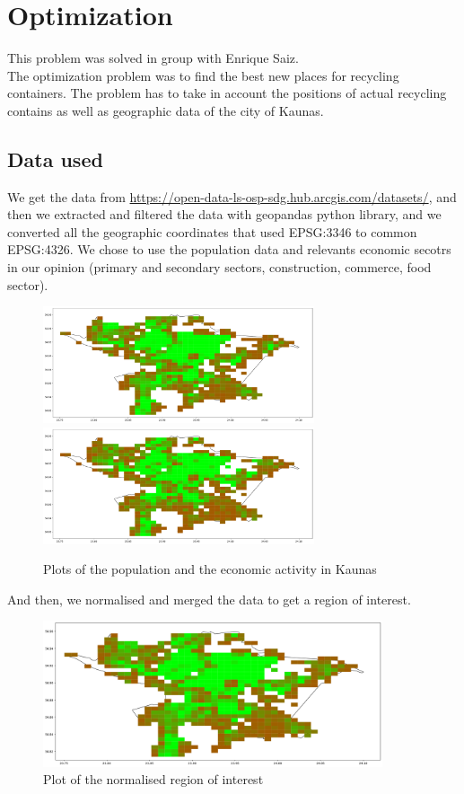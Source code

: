 \section{Optimization}
This problem was solved in group with Enrique Saiz.\\
The optimization problem was to find the best new places for recycling containers. The problem has to take in account the positions of actual recycling contains as well as geographic data of the city of Kaunas.\\
\subsection{Data used}
We get the data from \url{https://open-data-ls-osp-sdg.hub.arcgis.com/datasets/}, and then we extracted and filtered the data with geopandas python library, and we converted all the geographic coordinates that used EPSG:3346 to common EPSG:4326.
We chose to use the population data and relevants economic secotrs in our opinion (primary and secondary sectors, construction, commerce, food sector).\\
\begin{figure}[H]
    \centering
    \includegraphics[width=8cm]{images/part3/newpopnormalised.png}
    \includegraphics[width=8cm]{images/part3/neweconormalised.png}
    \caption{Plots of the population and the economic activity in Kaunas}
    \label{fig:economicandpop}
\end{figure}
And then, we normalised and merged the data to get a region of interest.\\
\begin{figure}[H]
    \centering
    \includegraphics[width=10cm]{images/part3/newnormalised.png}
    \caption{Plot of the normalised region of interest}
    \label{fig:normaliseddata}
\end{figure}
